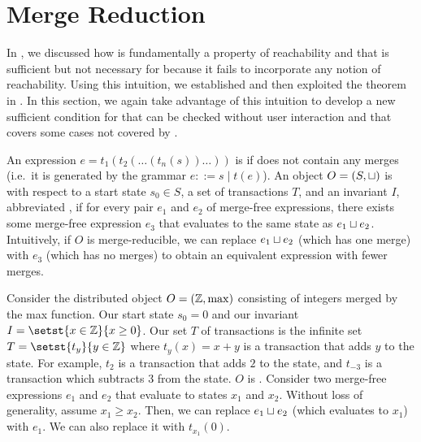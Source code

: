 \section{Merge Reduction}
In , we discussed how \invariantconfluence{} is
fundamentally a property of reachability and that \invariantclosure{} is
sufficient but not necessary for \invariantconfluence{} because it fails to
incorporate any notion of reachability. Using this intuition, we established
 and then exploited the theorem in
. In this section, we again take
advantage of this intuition to develop a new sufficient condition for
\invariantconfluence{} that can be checked without user interaction and that
covers some cases not covered by \invariantclosure{}.

An expression $e = t_1(t_2(\ldots(t_n(s))\ldots))$ is  if
does not contain any merges (i.e.\ it is generated by the grammar $e ::= s \mid
t(e)$). An object $O = (S, \sqcup)$ is  with respect to
a start state $s_0 \in S$, a set of transactions $T$, and an invariant $I$,
abbreviated , if for every pair $e_1$ and $e_2$ of
merge-free \sTIreachable{} expressions, there exists some merge-free
\sTIreachable{} expression $e_3$ that evaluates to the same state as $e_1 \sqcup
e_2$. Intuitively, if $O$ is merge-reducible, we can replace $e_1 \sqcup e_2$
(which has one merge) with $e_3$ (which has no merges) to obtain an equivalent
expression with fewer merges.

\begin{example}
  Consider the distributed object $O = (\mathbb{Z}, \max)$ consisting of integers
  merged by the max function. Our start state $s_0 = 0$ and our invariant
  $I = \setst{x \in \ints}{x \geq 0}$. Our set $T$ of transactions is the
  infinite set $T = \setst{t_y}{y \in \ints}$ where $t_y(x) = x + y$ is a
  transaction that adds $y$ to the state. For example, $t_2$ is a transaction
  that adds $2$ to the state, and $t_{-3}$ is a transaction which subtracts $3$
  from the state.
  $O$ is \sTImergereducible{}. Consider two merge-free \sTIreachable{}
  expressions $e_1$ and $e_2$ that evaluate to states $x_1$ and $x_2$. Without
  loss of generality, assume $x_1 \geq x_2$. Then, we can replace $e_1 \sqcup
  e_2$ (which evaluates to $x_1$) with $e_1$. We can also replace it with
  $t_{x_1}(0)$.
\end{example}

